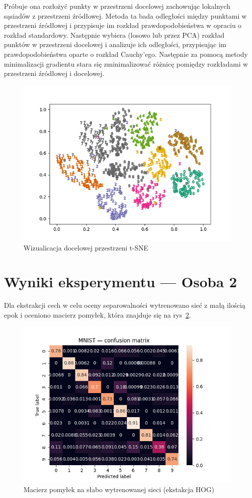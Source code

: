 \documentclass[10pt]{article}
\begin{document}
Próbuje ona rozłożyć punkty w przestrzeni docelowej zachowując lokalnych sąsiadów z przestrzeni źródłowej.
Metoda ta bada odległości między punktami w przestrzeni źródłowej i przypisuje im rozkład prawdopodobieństwa w opraciu o rozkład standardowy.
Następnie wybiera (losowo lub przez PCA) rozkład punktów w przestrzeni docelowej i analizuje ich odległości, przypisując im prawdopodobieństwa oparte o rozkład Cauchy'ego.
Następnie za pomocą metody minimalizacji gradientu stara się zminimalizować różnicę pomiędzy rozkładami w przestrzeni źródłowej i docelowej.

\begin{figure}[H]\centering
    \includegraphics[width=.6\linewidth]{img/tsne_embedding.png}
    \caption{Wizualicacja docelowej przestrzeni t-SNE}\label{fig:tsne-embed}
\end{figure}

\pagebreak

\section{Wyniki eksperymentu --- Osoba 2}

Dla ekstrakcji cech w celu oceny separowalności wytrenowano sieć z małą ilością epok i oceniono macierz pomyłek, która znajduje się na rys~\ref{fig:hog-bad-cm}.

\begin{figure}[H]\centering
    \includegraphics[width=.3\linewidth]{img/mnist_hog_bad_cm.png}
    \caption{Macierz pomyłek na słabo wytrenowanej sieci (ekstakcja HOG)}\label{fig:hog-bad-cm}
\end{figure}
\end{document}
